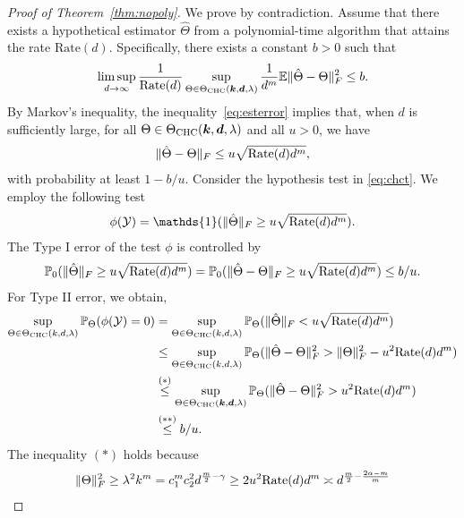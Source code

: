 \documentclass[12pt]{article}
\theoremstyle{definition}
\begin{document}
{\begin{proof}[Proof of Theorem~\ref{thm:nopoly}]
We prove by contradiction. Assume that there exists a hypothetical estimator $\hat\Theta$ from a polynomial-time algorithm  that attains the rate $\text{Rate}(d)$. Specifically, there exists a constant $b>0$ such that 
\begin{align}\label{eq:esterror}
   \limsup_{d\rightarrow\infty}\frac{1}{\textup{Rate}(d)} \sup_{\Theta\in\Theta_{\text{CHC}}(\bm{k},\bm{d},\lambda)}\frac{1}{d^m}\mathbb{E}\lVert\hat\Theta-\Theta\rVert_F^2\leq b.
\end{align}
By Markov's inequality, the inequality~\eqref{eq:esterror} implies that, when $d$ is sufficiently large, for all $\Theta\in\Theta_{\text{CHC}}(\bm{k},\bm{d},\lambda)$ and all $u>0$, we have
\begin{align}\label{eq:markov}
    \lVert\hat\Theta-\Theta\rVert_F\leq u \sqrt{\text{Rate}(d)d^{m}},
\end{align}
with probability at least $1-b/u$.
Consider the hypothesis test in \eqref{eq:chct}. We employ the following test 
\begin{align}
    \phi(\tY) = \mathds{1}(\FnormSize{}{\hat\Theta}\geq u\sqrt{\text{Rate}(d)d^m}).
\end{align}
The Type I error of the test $\phi$ is controlled by
\begin{align}
    \mathbb{P}_0(\lVert\hat\Theta\rVert_F\geq u\sqrt{\text{Rate}(d)d^m})  = \mathbb{P}_0(\lVert\hat\Theta-\Theta\rVert_F\geq u\sqrt{\text{Rate}(d)d^m}) \leq b/u.
\end{align}
For Type II error, we obtain,
\begin{align}
\sup_{\Theta\in\Theta_{\text{CHC}}(k,d,\lambda)}\mathbb{P}_\Theta(\phi(\mathcal{Y}) = 0) &= \sup_{\Theta\in\Theta_{\text{CHC}}(k,d,\lambda)}\mathbb{P}_\Theta(\lVert\hat\Theta\rVert_F< u \sqrt{\text{Rate}(d)d^m})\\&\leq\sup_{\Theta\in\Theta_{\text{CHC}}(k,d,\lambda)}\mathbb{P}_\Theta(\lVert\hat\Theta-\Theta\rVert_F^2> \lVert\Theta\rVert_F^2-u^2\text{Rate}(d)d^m)\\&\stackrel{(*)}{\leq}\sup_{\Theta\in\Theta_{\text{CHC}}(\bm{k},\bm{d},\lambda)}\mathbb{P}_\Theta(\lVert\hat\Theta-\Theta\rVert_F^2> u^2\text{Rate}(d)d^m)\\&\stackrel{(**)}{\leq} b/u.
\end{align}
The inequality $(*)$ holds because 
\begin{align}\label{eq:regime}
    \lVert\Theta\rVert_F^2\geq \lambda^2 k^m = c_1^mc_2^2d^{{m\over 2}-\gamma} \geq 2 u^2\text{Rate}(d)d^m \asymp d^{{m\over 2}-{2\alpha-m \over m}}
\end{align}

\end{proof}}
\end{document}
